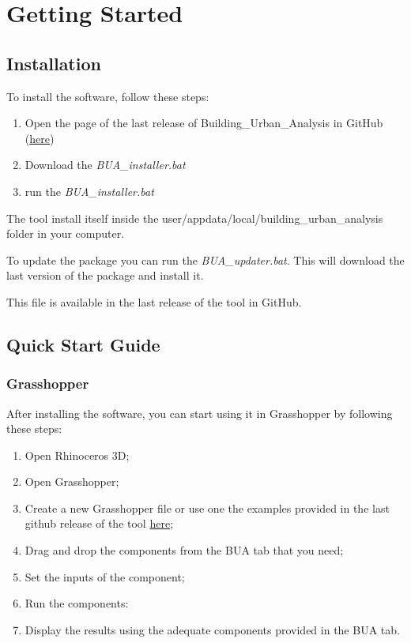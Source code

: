 \documentclass[a4paper,12pt]{article} %
\begin{document}
\section{Getting Started}
\label{sec:getting-started}

    \subsection{Installation}
    \label{subsec:installation}
    To install the software, follow these steps:
    \begin{enumerate}
        \item Open the page of the last release of Building\_Urban\_Analysis in GitHub (\href{https://github.com/Eliewiii/Building_Urban_Analysis}{here})
        \item Download the \textit{BUA\_installer.bat}
        \item run the \textit{BUA\_installer.bat}
    \end{enumerate}

    The tool install itself inside the user/appdata/local/building\_urban\_analysis folder in your computer.

    To update the package you can run the \textit{BUA\_updater.bat}.
    This will download the last version of the package and install it.

    This file is available in the last release of the tool in GitHub.

    \subsection{Quick Start Guide}
    \label{subsec:quick-start-guide}


    \subsubsection{Grasshopper}
    \label{subsubsec:quick-start-guide-grasshopper}
    After installing the software, you can start using it in Grasshopper by following these steps:
    \begin{enumerate}
        \item Open Rhinoceros 3D;
        \item Open Grasshopper;
        \item Create a new Grasshopper file or use one the examples provided in the last github release of the tool \href{https://github.com/Eliewiii/Building_Urban_Analysis/releases/latest/download/BUA_Grasshopper_example_files.zip}{here};
        \item Drag and drop the components from the BUA tab that you need;
        \item Set the inputs of the component;
        \item Run the components:
        \item Display the results using the adequate components provided in the BUA tab.
    \end{enumerate}
\end{document}
